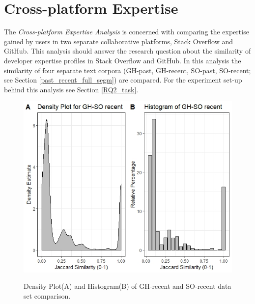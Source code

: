     \section{Cross-platform Expertise\label{sec:results_rq2}}
        
        The \emph{Cross-platform Expertise Analysis} is concerned with comparing the expertise gained by users in two separate collaborative platforms, Stack Overflow and GitHub. This analysis should answer the research question about the similarity of developer expertise profiles in Stack Overflow and GitHub. In this analysis the similarity of four separate text corpora (GH-past, GH-recent, SO-past, SO-recent; see Section \ref{past_recent_full_segm}) are compared. For the experiment set-up behind this analysis see Section \ref{RQ2_task}.
        
        \begin{figure}
          \centering
          \includegraphics[width=\textwidth]{figures/GH_SO_recent.jpeg}\\
          \caption{Density Plot(A) and Histogram(B) of GH-recent and SO-recent data set comparison.}
          \label{fig:GH_SO_recent}
        \end{figure}
        
